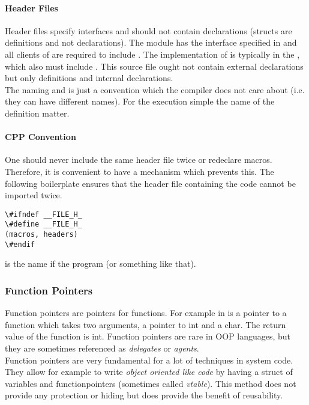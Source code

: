 \paragraph{Header Files}
Header files specify interfaces and should not contain declarations (structs are definitions and not declarations). The module  has the interface specified in  and all clients of  are required to include . The implementation of  is typically in the , which also must include . This source file ought not contain external declarations but only definitions and internal declarations.\\
The naming  and  is just a convention which the compiler does not care about (i.e. they can have different names). For the execution simple the name of the definition matter.

\paragraph{CPP Convention}
One should never include the same header file twice or redeclare macros. Therefore, it is convenient to have a mechanism which prevents this. The following boilerplate ensures that the header file containing the code cannot be imported twice.

\begin{lstlisting}
\#ifndef __FILE_H_
\#define __FILE_H_
(macros, headers)
\#endif
\end{lstlisting}

 is the name if the program (or something like that).

\subsubsection{Function Pointers}
Function pointers are pointers for functions. For example in   is a pointer to a function which takes two arguments, a pointer to int and a char. The return value of the function is int. Function pointers are rare in OOP languages, but they are sometimes referenced as \textit{delegates} or \textit{agents}.\\
Function pointers are very fundamental for a lot of techniques in system code. They allow for example to write \textit{object oriented like code} by having a struct of variables and functionpointers (sometimes called \textit{vtable}). This method does not provide any protection or hiding but does provide the benefit of reusability.

